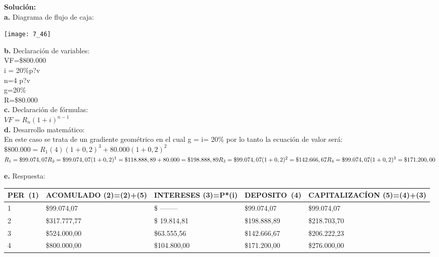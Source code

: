 \textbf{Solución:}\\
\textbf{a.}	Diagrama de flujo de caja:
\begin{center}
	\texttt{[image: 7\_46]}
\end{center}
\textbf{b.}	Declaración de variables:\\


	VF=\$800.000\\
	i = 20\%p?v\\
	n=4 p?v\\	
	g=20\%\\
	R=\$80.000\\
	
\textbf{c.}	Declaración de fórmulas:\\


	$VF=R_{n}(1+i)^{n-1}$ \hspace{35pt}\textit\\

\textbf{d.}	Desarrollo matemático:\\
En este caso se trata de un gradiente geométrico en el cual g = i= 20\% por lo tanto la    ecuación de valor será:\\

	$\$800.000 =R_{1}  (4) (1 +0,2)^{3}  + 80.000(1 +0,2)^{2}$\\

	$R_{1}  =\$99.074,07 \\
	R_{2}  =\$99.074,07 (1 +0,2)^{1}=\$118.888,89+80.000=\$198.888,89\\
	R_{3}  =\$99.074,07 (1 +0,2)^{2}=\$142.666,67\\
	R_{4}  =\$99.074,07 (1 +0,2)^{3}=\$171.200,00$

\textbf{e.}	Respuesta:

\begin{spacing}{1.1}
    \begin{center}
        \begin{tabular}{|p{1cm}|p{2.5cm}|p{2cm}|p{2cm}|p{3.5cm}|}
        \hline 
        \rowcolor{white!50}
            \textbf{PER\ (1)} & \textbf{ACOMULADO (2)=(2)+(5)} & \textbf{INTERESES  (3)=P*(i)}& \textbf{DEPOSITO\ (4)}& \textbf{CAPITALIZACÍON  (5)=(4)+(3)} \\ \hline                        

           
            1 & \$99.074,07  &\$ -------- & \$99.074,07  & \$99.074,07 \\ \hline
            2 & \$317.777,77 &\$ 19.814,81 & \$198.888,89  & \$218.703,70 \\ \hline
            3 & \$524.000,00 & \$63.555,56  & \$142.666,67 & \$206.222,23 \\ \hline
            4 & \$800.000,00  & \$104.800,00 & \$171.200,00  & \$276.000,00 \\ \hline

 
\end{tabular}
\end{center}
\end{spacing}

